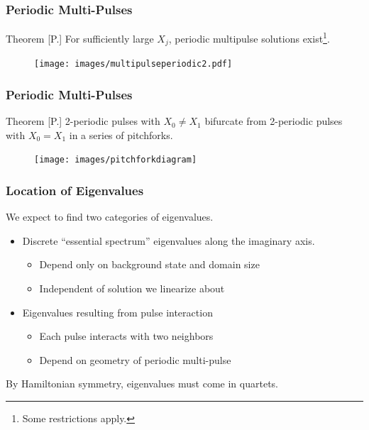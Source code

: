 \documentclass[16pt]{beamer}
\begin{document}
\begin{frame}
\frametitle{Periodic Multi-Pulses} 
	\fontsize{14}{7.2}\selectfont
    \begin{block}{Theorem [P.]}
    For sufficiently large $X_j$, periodic multipulse solutions exist\footnote{Some restrictions apply.}.

	\begin{figure}
	\begin{center}
	\texttt{[image: images/multipulseperiodic2.pdf]}
	\end{center}
	\end{figure}
    \end{block}
\end{frame}

\begin{frame}
\frametitle{Periodic Multi-Pulses} 
	\fontsize{14}{7.2}\selectfont
    \begin{block}{Theorem [P.]}
    2-periodic pulses with $X_0 \neq X_1$ bifurcate from 2-periodic pulses with $X_0 = X_1$ in a series of pitchforks.

	\begin{figure}
	\begin{center}
	\texttt{[image: images/pitchforkdiagram]}
	\end{center}
	\end{figure}
    \end{block}
\end{frame}

\begin{frame}
	\frametitle{Location of Eigenvalues}
	\fontsize{16}{7.2}\selectfont
	We expect to find two categories of eigenvalues.

	\begin{itemize}
		\item Discrete ``essential spectrum'' eigenvalues along the imaginary axis.
		\begin{itemize}
			\item Depend only on background state and domain size
			\item Independent of solution we linearize about
		\end{itemize}
		\item Eigenvalues resulting from pulse interaction 
		\begin{itemize}
			\item Each pulse interacts with two neighbors
			\item Depend on geometry of periodic multi-pulse
		\end{itemize}
	\end{itemize}
	\vspace{0.5cm}

	By Hamiltonian symmetry, eigenvalues must come in quartets.
\end{frame}
\end{document}
